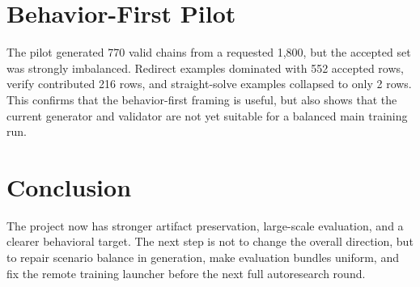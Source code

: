 \documentclass[11pt]{article}
\begin{document}
\section*{Behavior-First Pilot}
The pilot generated 770 valid chains from a requested 1,800, but the accepted set was strongly imbalanced. Redirect examples dominated with 552 accepted rows, verify contributed 216 rows, and straight-solve examples collapsed to only 2 rows. This confirms that the behavior-first framing is useful, but also shows that the current generator and validator are not yet suitable for a balanced main training run.

\section*{Conclusion}
The project now has stronger artifact preservation, large-scale evaluation, and a clearer behavioral target. The next step is not to change the overall direction, but to repair scenario balance in generation, make evaluation bundles uniform, and fix the remote training launcher before the next full autoresearch round.
\end{document}

